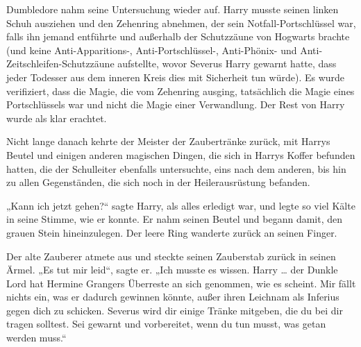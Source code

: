 Dumbledore nahm seine Untersuchung wieder auf. Harry musste seinen linken Schuh ausziehen und den Zehenring abnehmen, der sein Notfall-Portschlüssel war, falls ihn jemand entführte und außerhalb der Schutzzäune von Hogwarts brachte (und keine Anti-Apparitions-, Anti-Portschlüssel-, Anti-Phönix- und Anti-Zeitschleifen-Schutzzäune aufstellte, wovor Severus Harry gewarnt hatte, dass jeder Todesser aus dem inneren Kreis dies mit Sicherheit tun würde). Es wurde verifiziert, dass die Magie, die vom Zehenring ausging, tatsächlich die Magie eines Portschlüssels war und nicht die Magie einer Verwandlung. Der Rest von Harry wurde als klar erachtet.

Nicht lange danach kehrte der Meister der Zaubertränke zurück, mit Harrys Beutel und einigen anderen magischen Dingen, die sich in Harrys Koffer befunden hatten, die der Schulleiter ebenfalls untersuchte, eins nach dem anderen, bis hin zu allen Gegenständen, die sich noch in der Heilerausrüstung befanden.

„Kann ich jetzt gehen?“ sagte Harry, als alles erledigt war, und legte so viel Kälte in seine Stimme, wie er konnte. Er nahm seinen Beutel und begann damit, den grauen Stein hineinzulegen. Der leere Ring wanderte zurück an seinen Finger.

Der alte Zauberer atmete aus und steckte seinen Zauberstab zurück in seinen Ärmel.
„Es tut mir leid“, sagte er.
„Ich musste es wissen. Harry … der Dunkle Lord hat Hermine Grangers Überreste an sich genommen, wie es scheint. Mir fällt nichts ein, was er dadurch gewinnen könnte, außer ihren Leichnam als Inferius gegen dich zu schicken. Severus wird dir einige Tränke mitgeben, die du bei dir tragen solltest. Sei gewarnt und vorbereitet, wenn du tun musst, was getan werden muss.“

